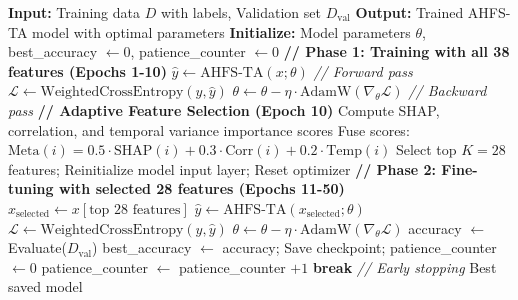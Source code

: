 \documentclass[journal]{IEEEtran}
\begin{document}
\begin{algorithm}[h]
\caption{AHFS-TA Complete Training Procedure}
\label{alg:training}
\begin{algorithmic}[1]
\STATE \textbf{Input:} Training data $D$ with labels, Validation set $D_{\text{val}}$
\STATE \textbf{Output:} Trained AHFS-TA model with optimal parameters
\STATE \textbf{Initialize:} Model parameters $\theta$, best\_accuracy $\leftarrow 0$, patience\_counter $\leftarrow 0$
\STATE
\STATE \textbf{// Phase 1: Training with all 38 features (Epochs 1-10)}
        \STATE $\hat{y} \leftarrow \text{AHFS-TA}(x; \theta)$ \quad \textit{// Forward pass}
        \STATE $\mathcal{L} \leftarrow \text{WeightedCrossEntropy}(y, \hat{y})$
        \STATE $\theta \leftarrow \theta - \eta \cdot \text{AdamW}(\nabla_\theta \mathcal{L})$ \quad \textit{// Backward pass}
    \ENDFOR
\ENDFOR
\STATE
\STATE \textbf{// Adaptive Feature Selection (Epoch 10)}
\STATE Compute SHAP, correlation, and temporal variance importance scores
\STATE Fuse scores: $\text{Meta}(i) = 0.5 \cdot \text{SHAP}(i) + 0.3 \cdot \text{Corr}(i) + 0.2 \cdot \text{Temp}(i)$
\STATE Select top $K=28$ features; Reinitialize model input layer; Reset optimizer
\STATE
\STATE \textbf{// Phase 2: Fine-tuning with selected 28 features (Epochs 11-50)}
        \STATE $x_{\text{selected}} \leftarrow x[\text{top 28 features}]$
        \STATE $\hat{y} \leftarrow \text{AHFS-TA}(x_{\text{selected}}; \theta)$
        \STATE $\mathcal{L} \leftarrow \text{WeightedCrossEntropy}(y, \hat{y})$
        \STATE $\theta \leftarrow \theta - \eta \cdot \text{AdamW}(\nabla_\theta \mathcal{L})$
    \ENDFOR
    \STATE accuracy $\leftarrow$ Evaluate($D_{\text{val}}$)
        \STATE best\_accuracy $\leftarrow$ accuracy; Save checkpoint; patience\_counter $\leftarrow 0$
    \ELSE
        \STATE patience\_counter $\leftarrow$ patience\_counter $+ 1$
    \ENDIF
        \STATE \textbf{break} \quad \textit{// Early stopping}
    \ENDIF
\ENDFOR
\RETURN Best saved model
\end{algorithmic}
\end{algorithm}
\end{document}
